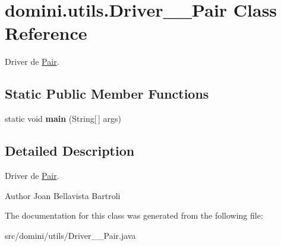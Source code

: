 \hypertarget{classdomini_1_1utils_1_1Driver____Pair}{}\section{domini.\+utils.\+Driver\+\_\+\+\_\+\+Pair Class Reference}
\label{classdomini_1_1utils_1_1Driver____Pair}


Driver de \hyperlink{classdomini_1_1utils_1_1Pair}{Pair}.  


\subsection*{Static Public Member Functions}
\begin{DoxyCompactItemize}
\item 
\mbox{\label{classdomini_1_1utils_1_1Driver____Pair_a6f6dda90b506c692dd03c4fc174550b7}} 
static void {\bfseries main} (String\mbox{[}$\,$\mbox{]} args)
\end{DoxyCompactItemize}


\subsection{Detailed Description}
Driver de \hyperlink{classdomini_1_1utils_1_1Pair}{Pair}. 

\begin{DoxyAuthor}{Author}
Joan Bellavista Bartroli 
\end{DoxyAuthor}


The documentation for this class was generated from the following file\+:\begin{DoxyCompactItemize}
\item 
src/domini/utils/Driver\+\_\+\+\_\+\+Pair.\+java\end{DoxyCompactItemize}
